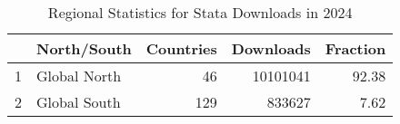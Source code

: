 \begin{table}[ht]
\centering
\begin{tabular}{rlrrr}
  \hline
 & North/South & Countries & Downloads & Fraction \\ 
  \hline
1 & Global North &  46 & 10101041 & 92.38 \\ 
  2 & Global South & 129 & 833627 & 7.62 \\ 
   \hline
\end{tabular}
\caption{Regional Statistics for Stata Downloads in 2024} 
\label{tab:stata_downloads_global_stats_2024}
\end{table}
